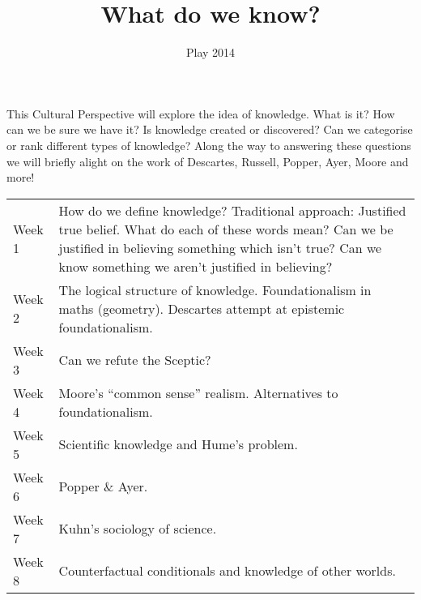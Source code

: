 \documentclass[10pt]{article}
\title{What do we know?}
\date{Play 2014}
\begin{document}
\maketitle\thispagestyle{empty}
 This Cultural Perspective will explore the idea of knowledge. What is it? How can we be sure we have it? Is knowledge created or discovered? Can we categorise or rank different types of knowledge? Along the way to answering these questions we will briefly alight on the work of Descartes, Russell, Popper, Ayer, Moore and more! 
\begin{table}[htdp]
\normalsize

\begin{tabular}{p{}p{}}
Week 1 & How do we define knowledge? Traditional approach: Justified true belief. What do each of these words mean? Can we be justified in believing something which isn't true? Can we know something we aren't justified in believing? \\ 
Week 2 & The logical structure of knowledge. Foundationalism in maths (geometry). Descartes attempt at epistemic foundationalism. \\ 
Week 3 & Can we refute the Sceptic? \\ 
Week 4 & Moore's ``common sense'' realism. Alternatives to foundationalism. \\ 
Week 5 & Scientific knowledge and Hume's problem.\\ 
Week 6 & Popper \& Ayer. \\ 
Week 7 & Kuhn's sociology of science. \\ 
Week 8 & Counterfactual conditionals and knowledge of other worlds. \\

\end{tabular}

\label{default}
\end{table}%
\end{document}
